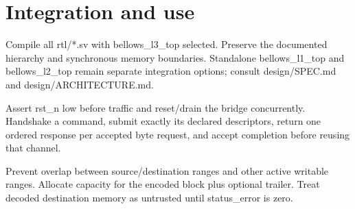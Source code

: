 \documentclass[11pt,a4paper]{article}
\begin{document}
\section{Integration and use}

Comp\allowbreak{}ile all rtl/\allowbreak{}*\allowbreak{}.sv with bell\allowbreak{}ows\_\allowbreak{}l3\_\allowbreak{}top sele\allowbreak{}cted. Pres\allowbreak{}erve the docu\allowbreak{}ment\allowbreak{}ed hier\allowbreak{}arch\allowbreak{}y and sync\allowbreak{}hron\allowbreak{}ous memo\allowbreak{}ry boun\allowbreak{}dari\allowbreak{}es. Stan\allowbreak{}dalo\allowbreak{}ne bell\allowbreak{}ows\_\allowbreak{}l1\_\allowbreak{}top and bell\allowbreak{}ows\_\allowbreak{}l2\_\allowbreak{}top rema\allowbreak{}in sepa\allowbreak{}rate inte\allowbreak{}grat\allowbreak{}ion opti\allowbreak{}ons; cons\allowbreak{}ult desi\allowbreak{}gn/\allowbreak{}SPEC.md and desi\allowbreak{}gn/\allowbreak{}ARCH\allowbreak{}ITEC\allowbreak{}TURE.md.


Asse\allowbreak{}rt rst\_\allowbreak{}n low befo\allowbreak{}re traf\allowbreak{}fic and rese\allowbreak{}t/\allowbreak{}drai\allowbreak{}n the brid\allowbreak{}ge conc\allowbreak{}urre\allowbreak{}ntly. Hand\allowbreak{}shak\allowbreak{}e a comm\allowbreak{}and,\allowbreak{} subm\allowbreak{}it exac\allowbreak{}tly its decl\allowbreak{}ared desc\allowbreak{}ript\allowbreak{}ors,\allowbreak{} retu\allowbreak{}rn one orde\allowbreak{}red resp\allowbreak{}onse per acce\allowbreak{}pted byte requ\allowbreak{}est,\allowbreak{} and acce\allowbreak{}pt comp\allowbreak{}leti\allowbreak{}on befo\allowbreak{}re reus\allowbreak{}ing that chan\allowbreak{}nel.


Prev\allowbreak{}ent over\allowbreak{}lap betw\allowbreak{}een sour\allowbreak{}ce/\allowbreak{}dest\allowbreak{}inat\allowbreak{}ion rang\allowbreak{}es and othe\allowbreak{}r acti\allowbreak{}ve writ\allowbreak{}able rang\allowbreak{}es. Allo\allowbreak{}cate capa\allowbreak{}city for the enco\allowbreak{}ded bloc\allowbreak{}k plus opti\allowbreak{}onal trai\allowbreak{}ler. Trea\allowbreak{}t deco\allowbreak{}ded dest\allowbreak{}inat\allowbreak{}ion memo\allowbreak{}ry as untr\allowbreak{}uste\allowbreak{}d unti\allowbreak{}l stat\allowbreak{}us\_\allowbreak{}erro\allowbreak{}r is zero.
\end{document}
